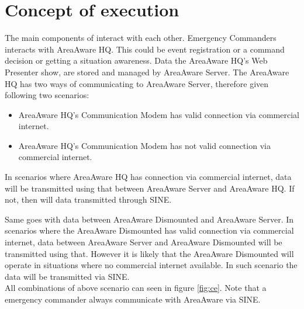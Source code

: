 \section{Concept of execution}
\label{sec:concept_execution}

The main components of interact with each other.
Emergency Commanders interacts with AreaAware HQ.
This could be event registration or a command decision or getting a situation awareness.
Data the AreaAware HQ's Web Presenter show, are stored and managed by AreaAware Server.
The AreaAware HQ has two ways of communicating to AreaAware Server, therefore given following two scenarios:
\begin{itemize}
\item AreaAware HQ's Communication Modem has valid connection via commercial internet.
\item AreaAware HQ's Communication Modem has not valid connection via commercial internet.
\end{itemize}
In scenarios where AreaAware HQ has connection via commercial internet, data will be transmitted using that between AreaAware Server and AreaAware HQ.
If not, then will data transmitted through SINE.


\noindent Same goes with data between AreaAware Dismounted and AreaAware Server.
In scenarios where the AreaAware Dismounted has valid connection via commercial internet, data between AreaAware Server and AreaAware Dismounted will be transmitted using that.
However it is likely that the AreaAware Dismounted will operate in situations where no commercial internet available.
In such scenario the data will be transmitted via SINE.\\

\noindent All combinations of above scenario can seen in figure \ref{fig:ce}.
Note that a emergency commander always communicate with AreaAware via SINE.

